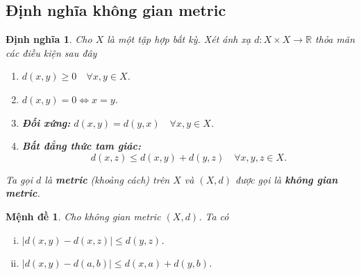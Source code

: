 \documentclass[a4paper, 12pt]{article}
\newtheorem{definition}[theorem]{Định nghĩa}
\newtheorem{proposition}[theorem]{Mệnh đề}
\begin{document}
\subsection{Định nghĩa không gian metric}
\begin{definition}
Cho $X$ là một tập hợp bất kỳ. Xét ánh xạ $d: X \times X \to \mathbb{R}$ thỏa mãn các điều kiện sau đây
\begin{enumerate}
    \item $d(x,y) \ge 0 \quad \forall x,y \in X$.
    \item $d(x,y)=0 \Leftrightarrow x=y$.
    \item \textbf{Đối xứng:} $d(x,y)=d(y,x) \quad \forall x,y \in X$.
    \item \textbf{Bất đẳng thức tam giác:}
    $$d(x,z) \le d(x,y) + d(y,z) \quad \forall x,y,z \in X.$$
\end{enumerate}
Ta gọi $d$ là \textbf{metric} (khoảng cách) trên $X$ và $(X,d)$ được gọi là \textbf{không gian metric}.
\end{definition}
\begin{proposition}
Cho không gian metric $(X,d)$. Ta có
\begin{enumerate}[i)]
    \item $|d(x,y)-d(x,z)| \le d(y,z)$.
    \item $|d(x,y)-d(a,b)| \le d(x,a)+d(y,b)$.
\end{enumerate}
\end{proposition}
\end{document}
